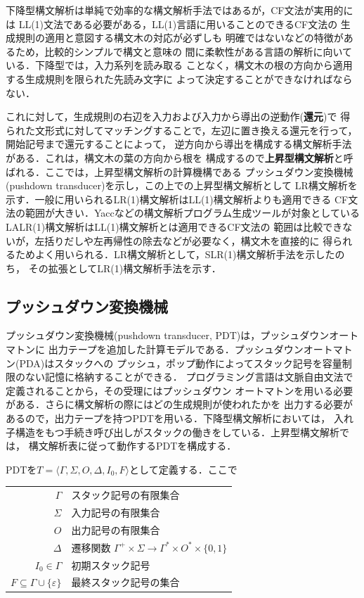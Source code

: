 \documentclass[a4j,dvipdfmx]{jbook}
\begin{document}
下降型構文解析は単純で効率的な構文解析手法ではあるが，CF文法が実用的には
LL(1)文法である必要がある，LL(1)言語に用いることのできるCF文法の
生成規則の適用と意図する構文木の対応が必ずしも
明確ではないなどの特徴があるため，比較的シンプルで構文と意味の
間に柔軟性がある言語の解析に向いている．下降型では，入力系列を読み取る
ことなく，構文木の根の方向から適用する生成規則を限られた先読み文字に
よって決定することができなければならない．

これに対して，生成規則の右辺を入力および入力から導出の逆動作({\bf 還元})で
得られた文形式に対してマッチングすることで，左辺に置き換える還元を行って，
開始記号まで還元することによって，
逆方向から導出を構成する構文解析手法がある．これは，構文木の葉の方向から根を
構成するので{\bf 上昇型構文解析}と呼ばれる．ここでは，上昇型構文解析の計算機構である
プッシュダウン変換機械(pushdown transducer)を示し，この上での上昇型構文解析として
LR構文解析を示す．一般に用いられるLR(1)構文解析はLL(1)構文解析よりも適用できる
CF文法の範囲が大きい．Yaccなどの構文解析プログラム生成ツールが対象としている
LALR(1)構文解析はLL(1)構文解析とは適用できるCF文法の
範囲は比較できないが，左括りだしや左再帰性の除去などが必要なく，構文木を直接的に
得られるためよく用いられる．LR構文解析として，SLR(1)構文解析手法を示したのち，
その拡張としてLR(1)構文解析手法を示す．

\subsection{プッシュダウン変換機械}

プッシュダウン変換機械(pushdown transducer, PDT)は，プッシュダウンオートマトンに
出力テープを追加した計算モデルである．プッシュダウンオートマトン(PDA)はスタックへの
プッシュ，ポップ動作によってスタック記号を容量制限のない記憶に格納することができる．
プログラミング言語は文脈自由文法で定義されることから，その受理にはプッシュダウン
オートマトンを用いる必要がある．さらに構文解析の際にはどの生成規則が使われたかを
出力する必要があるので，出力テープを持つPDTを用いる．下降型構文解析においては，
入れ子構造をもつ手続き呼び出しがスタックの働きをしている．上昇型構文解析では，
構文解析表に従って動作するPDTを構成する．

\begin{Def}
  PDTを$T=\langle\Gamma,\Sigma,O,\Delta,I_0,F\rangle$として定義する．ここで
  
  \begin{tabular}{rl}
    $\Gamma$ & スタック記号の有限集合\\
    $\Sigma$ & 入力記号の有限集合\\
    $O$ & 出力記号の有限集合\\
    $\Delta$ & 遷移関数 $\Gamma^+\times\Sigma\rightarrow\Gamma^\ast\times O^\ast\times\{0,1\}$\\
    $I_0\in\Gamma$ & 初期スタック記号\\
    $F\subseteq\Gamma\cup\{\varepsilon\}$ & 最終スタック記号の集合
  \end{tabular}
\end{Def}
\end{document}
